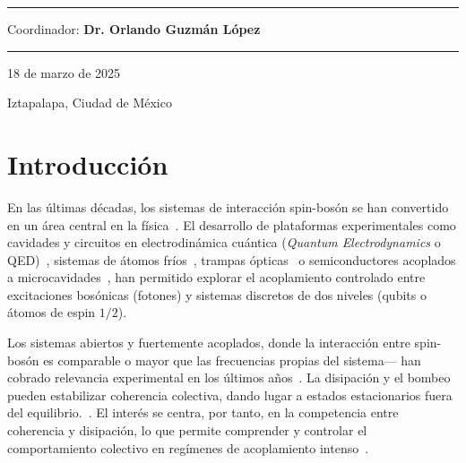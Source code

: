 \documentclass[onecolumn,notitlepage,letterpaper,aps,pra,12pt]{article}
\numberwithin{equation}{section}
\begin{document}
\begin{titlepage}
\vspace{1cm}
\rule{5cm}{0.3mm}

\vspace{0.45cm}
{\large Coordinador: \textbf{Dr. Orlando Guzmán López}  \par}

{\LARGE \rule{15cm}{1.0mm}  \par}

\vspace{0.4cm}

{\large 18 de marzo de 2025 \par}
\vspace{0.1cm}
{\large Iztapalapa, Ciudad de México \par}
\end{titlepage}

\clearpage
\tableofcontents
\clearpage
\newpage



\section{Introducción}



En las últimas décadas, los sistemas de interacción spin-bosón se han convertido en un área central en la física~\cite{haroche2006}. El desarrollo de plataformas experimentales como cavidades y circuitos en electrodinámica cuántica (\textit{Quantum Electrodynamics} o QED)~\cite{Clerk2020}, sistemas de átomos fríos~\cite{Mekhov2012}, trampas ópticas~\cite{Yuanjie2021} o semiconductores acoplados a microcavidades~\cite{Schneider2018}, han permitido explorar el acoplamiento controlado entre excitaciones bosónicas (fotones) y sistemas discretos de dos niveles (qubits o átomos de espin $1/2$). 




Los sistemas abiertos y fuertemente acoplados, donde la interacción entre spin-bosón es comparable o mayor que las frecuencias propias del sistema— han cobrado relevancia experimental en los últimos años~\cite{Fazio2025}. La disipación y el bombeo pueden estabilizar coherencia colectiva, dando lugar a estados estacionarios fuera del equilibrio.~\cite{Sieberer2016,Halati2020}. El interés se centra, por tanto, en la competencia entre coherencia y disipación, lo que permite comprender y controlar el comportamiento colectivo en regímenes de acoplamiento intenso~\cite{Kirton2018}.
\end{document}
